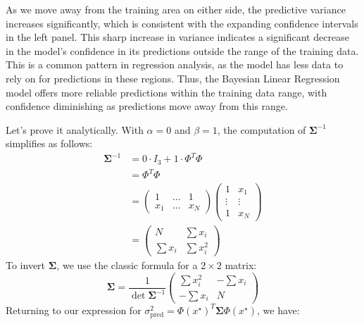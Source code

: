 As we move away from the training area on either side, the predictive variance increases significantly, which is consistent with the expanding confidence intervals in the left panel. This sharp increase in variance indicates a significant decrease in the model's confidence in its predictions outside the range of the training data. This is a common pattern in regression analysis, as the model has less data to rely on for predictions in these regions. Thus, the Bayesian Linear Regression model offers more reliable predictions within the training data range, with confidence diminishing as predictions move away from this range.\newline

\noindent Let's prove it analytically. With $\alpha = 0$ and $\beta = 1$, the computation of $\boldsymbol{\Sigma}^{-1}$ simplifies as follows:
\begin{align*}
    \boldsymbol{\Sigma}^{-1} 
        &= 0 \cdot I_3 + 1 \cdot \Phi^T \Phi \\
        &= \Phi^T \Phi \\ 
        &= \begin{pmatrix}
            1 & \dots & 1 \\
            x_1 & \dots & x_N
        \end{pmatrix} 
        \begin{pmatrix}
            1 & x_1 \\
            \vdots & \vdots \\
            1 & x_N 
        \end{pmatrix} \\
        &= \begin{pmatrix}
            N & \sum x_i \\
            \sum x_i & \sum x_i^2
        \end{pmatrix}
\end{align*}
To invert $\boldsymbol{\Sigma}$, we use the classic formula for a $2 \times 2$ matrix:
\[
    \boldsymbol{\Sigma} = \frac{1}{\det \boldsymbol{\Sigma}^{-1}} \begin{pmatrix}
        \sum x_i^2 & - \sum x_i \\
        - \sum x_i & N
    \end{pmatrix}
\]
Returning to our expression for $ \sigma^2_{\text{pred}} = \Phi (x^\star ) ^T \boldsymbol{\Sigma} \Phi (x^\star )$, we have:
